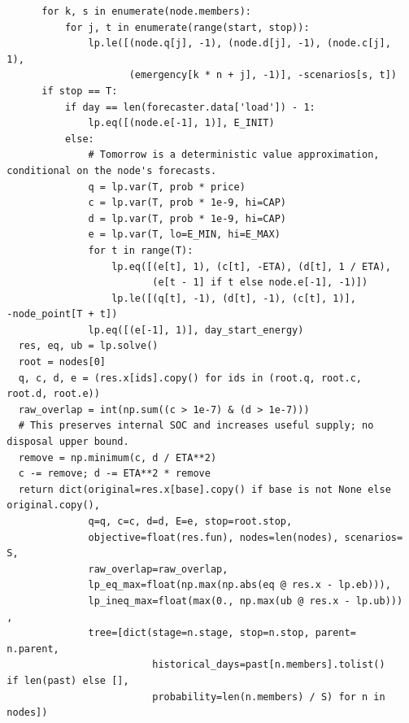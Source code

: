 \begin{verbatim}
        for k, s in enumerate(node.members):
            for j, t in enumerate(range(start, stop)):
                lp.le([(node.q[j], -1), (node.d[j], -1), (node.c[j],
  1),
                       (emergency[k * n + j], -1)], -scenarios[s, t])
        if stop == T:
            if day == len(forecaster.data['load']) - 1:
                lp.eq([(node.e[-1], 1)], E_INIT)
            else:
                # Tomorrow is a deterministic value approximation,
  conditional on the node's forecasts.
                q = lp.var(T, prob * price)
                c = lp.var(T, prob * 1e-9, hi=CAP)
                d = lp.var(T, prob * 1e-9, hi=CAP)
                e = lp.var(T, lo=E_MIN, hi=E_MAX)
                for t in range(T):
                    lp.eq([(e[t], 1), (c[t], -ETA), (d[t], 1 / ETA),
                           (e[t - 1] if t else node.e[-1], -1)])
                    lp.le([(q[t], -1), (d[t], -1), (c[t], 1)],
  -node_point[T + t])
                lp.eq([(e[-1], 1)], day_start_energy)
    res, eq, ub = lp.solve()
    root = nodes[0]
    q, c, d, e = (res.x[ids].copy() for ids in (root.q, root.c,
  root.d, root.e))
    raw_overlap = int(np.sum((c > 1e-7) & (d > 1e-7)))
    # This preserves internal SOC and increases useful supply; no
  disposal upper bound.
    remove = np.minimum(c, d / ETA**2)
    c -= remove; d -= ETA**2 * remove
    return dict(original=res.x[base].copy() if base is not None else
  original.copy(),
                q=q, c=c, d=d, E=e, stop=root.stop,
                objective=float(res.fun), nodes=len(nodes), scenarios=
  S,
                raw_overlap=raw_overlap,
                lp_eq_max=float(np.max(np.abs(eq @ res.x - lp.eb))),
                lp_ineq_max=float(max(0., np.max(ub @ res.x - lp.ub)))
  ,
                tree=[dict(stage=n.stage, stop=n.stop, parent=
  n.parent,
                           historical_days=past[n.members].tolist()
  if len(past) else [],
                           probability=len(n.members) / S) for n in
  nodes])
\end{verbatim}

